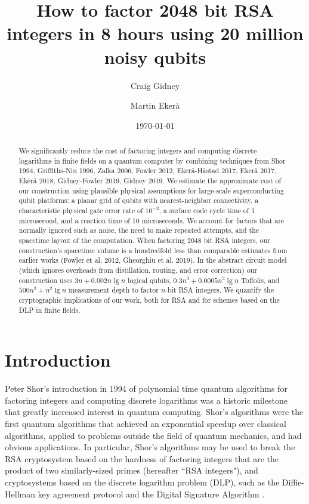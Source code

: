 \documentclass[superscriptaddress,notitlepage,longbibliography]{revtex4-1}
\theoremstyle{definition}
\theoremstyle{definition}
\begin{document}
\title{How to factor 2048 bit RSA integers in 8 hours using 20 million noisy qubits}

\date{\today}
\author{Craig Gidney}
\author{Martin Ekerå}

\begin{abstract}
We significantly reduce the cost of factoring integers and computing discrete logarithms in finite fields on a quantum computer by combining techniques from Shor 1994, Griffiths-Niu 1996, Zalka 2006, Fowler 2012, Ekerå-Håstad 2017, Ekerå 2017, Ekerå 2018, Gidney-Fowler 2019, Gidney 2019.
We estimate the approximate cost of our construction using plausible physical assumptions for large-scale superconducting qubit platforms:
 a planar grid of qubits with nearest-neighbor connectivity,
 a characteristic physical gate error rate of $10^{-3}$,
 a surface code cycle time of 1 microsecond,
 and a reaction time of 10 microseconds.
We account for factors that are normally ignored such as noise, the need to make repeated attempts, and the spacetime layout of the computation.
When factoring 2048 bit RSA integers, our construction's spacetime volume is a hundredfold less than comparable estimates from earlier works (Fowler et al. 2012, Gheorghiu et al. 2019).
In the abstract circuit model (which ignores overheads from distillation, routing, and error correction) our construction uses $3 n + 0.002 n \lg n$ logical qubits, $0.3 n^3 + 0.0005 n^3 \lg n$ Toffolis, and $500 n^2 + n^2 \lg n$ measurement depth to factor $n$-bit RSA integers.
We quantify the cryptographic implications of our work, both for RSA and for schemes based on the DLP in finite fields.
\end{abstract}

\maketitle

\section{Introduction}
\label{sec:introduction}
Peter Shor's introduction in 1994 of polynomial time quantum algorithms for factoring integers and computing discrete logarithms \cite{shor1994,Timeline} was a historic milestone that greatly increased interest in quantum computing.
Shor's algorithms were the first quantum algorithms that achieved an exponential speedup over classical algorithms, applied to problems outside the field of quantum mechanics, and had obvious applications.
In particular, Shor's algorithms may be used to break the RSA cryptosystem \cite{rsa} based on the hardness of factoring integers that are the product of two similarly-sized primes (hereafter ``RSA integers"), and cryptosystems based on the discrete logarithm problem (DLP), such as the Diffie-Hellman key agreement protocol \cite{diffie-hellman} and the Digital Signature Algorithm \cite{fips-186-4}.
\end{document}
